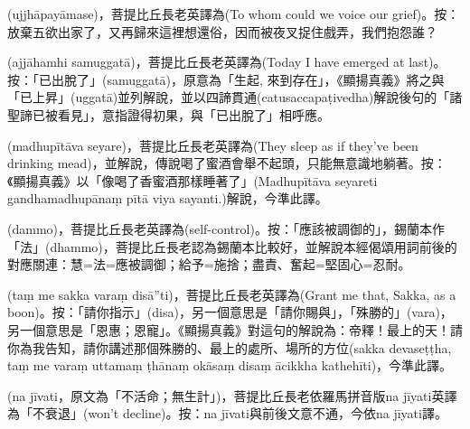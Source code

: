 \startitemgroup[noteitems]
\item{}(ujjhāpayāmase)，菩提比丘長老英譯為(To whom could we voice our grief)。按：放棄五欲出家了，又再歸來這裡想還俗，因而被夜叉捉住戲弄，我們抱怨誰？
\stopitemgroup

\startitemgroup[noteitems]
\item{}(ajjāhamhi samuggatā)，菩提比丘長老英譯為(Today I have emerged at last)。按：「已出脫了」(samuggatā)，原意為「生起, 來到存在」，《顯揚真義》將之與「已上昇」(uggatā)並列解說，並以四諦貫通(catusaccapaṭivedha)解說後句的「諸聖諦已被看見」，意指證得初果，與「已出脫了」相呼應。
\stopitemgroup

\startitemgroup[noteitems]
\item{}(madhupītāva seyare)，菩提比丘長老英譯為(They sleep as if they've been drinking mead)，並解說，傳說喝了蜜酒會舉不起頭，只能無意識地躺著。按：《顯揚真義》以「像喝了香蜜酒那樣睡著了」(Madhupītāva seyareti gandhamadhupānaṃ pītā viya sayanti.)解說，今準此譯。
\stopitemgroup

\startitemgroup[noteitems]
\item{}(dammo)，菩提比丘長老英譯為(self-control)。按：「應該被調御的」，錫蘭本作「法」(dhammo)，菩提比丘長老認為錫蘭本比較好，並解說本經偈頌用詞前後的對應關連：慧=法=應被調御；給予=施捨；盡責、奮起=堅固心=忍耐。
\stopitemgroup

\startitemgroup[noteitems]
\item{}(taṃ me sakka varaṃ disā”ti)，菩提比丘長老英譯為(Grant me that, Sakka, as a boon)。按：「請你指示」(disa)，另一個意思是「請你賜與」，「殊勝的」(vara)，另一個意思是「恩惠；恩寵」。《顯揚真義》對這句的解說為：帝釋！最上的天！請你為我告知，請你講述那個殊勝的、最上的處所、場所的方位(sakka devaseṭṭha, taṃ me varaṃ uttamaṃ ṭhānaṃ okāsaṃ disaṃ ācikkha kathehīti)，今準此譯。
\stopitemgroup

\startitemgroup[noteitems]
\item{}(na jīvati，原文為「不活命；無生計」)，菩提比丘長老依羅馬拼音版na jīyati英譯為「不衰退」(won't decline)。按：na jīvati與前後文意不通，今依na jīyati譯。
\stopitemgroup


